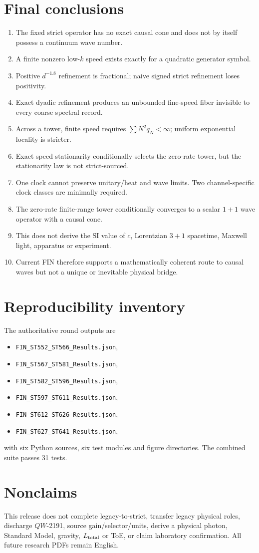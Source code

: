 \documentclass[11pt,a4paper]{article}
\theoremstyle{remark}\newtheorem{remark}[theorem]{Remark}
\begin{document}
\section{Final conclusions}
\begin{enumerate}
\item The fixed strict operator has no exact causal cone and does not by itself possess a continuum wave number.
\item A finite nonzero low-$k$ speed exists exactly for a quadratic generator symbol.
\item Positive $d^{-1.8}$ refinement is fractional; naive signed strict refinement loses positivity.
\item Exact dyadic refinement produces an unbounded fine-speed fiber invisible to every coarse spectral record.
\item Across a tower, finite speed requires $\sum N^2q_N<\infty$; uniform exponential locality is stricter.
\item Exact speed stationarity conditionally selects the zero-rate tower, but the stationarity law is not strict-sourced.
\item One clock cannot preserve unitary/heat and wave limits. Two channel-specific clock classes are minimally required.
\item The zero-rate finite-range tower conditionally converges to a scalar $1+1$ wave operator with a causal cone.
\item This does not derive the SI value of $c$, Lorentzian $3+1$ spacetime, Maxwell light, apparatus or experiment.
\item Current FIN therefore supports a mathematically coherent route to causal waves but not a unique or inevitable physical bridge.
\end{enumerate}

\appendix
\section{Reproducibility inventory}
The authoritative round outputs are
\begin{itemize}
\item \texttt{FIN\_ST552\_ST566\_Results.json},
\item \texttt{FIN\_ST567\_ST581\_Results.json},
\item \texttt{FIN\_ST582\_ST596\_Results.json},
\item \texttt{FIN\_ST597\_ST611\_Results.json},
\item \texttt{FIN\_ST612\_ST626\_Results.json},
\item \texttt{FIN\_ST627\_ST641\_Results.json},
\end{itemize}
with six Python sources, six test modules and figure directories. The combined suite passes 31 tests.

\section{Nonclaims}
This release does not complete legacy-to-strict, transfer legacy physical roles, discharge $QW$-2191, source gain/selector/units, derive a physical photon, Standard Model, gravity, $L_{\rm total}$ or ToE, or claim laboratory confirmation. All future research PDFs remain English.
\end{document}
